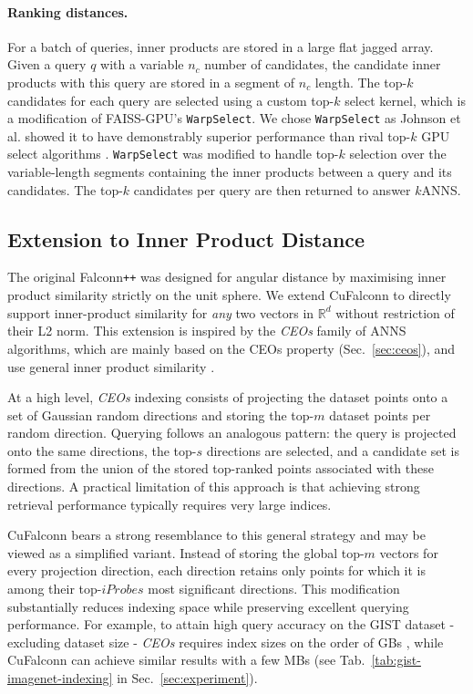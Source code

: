 \documentclass{article}
\newcommand{\Rd}{\mathbb{R}^d}
\newcommand{\ws}{\texttt{WarpSelect}\xspace}
\newcommand{\cf}{CuFalconn\xspace}
\newcommand{\fpp}{Falconn\texttt{++}\xspace}
\newcommand{\fgpu}{FAISS-GPU\xspace}
\begin{document}
\paragraph{Ranking distances.} 

For a batch of queries, inner products are stored in a large flat jagged array. Given a query $q$ with a variable $n_c$ number of candidates, the candidate inner products with this query are stored in a segment of $n_c$ length. The top-$k$ candidates for each query are selected using a custom top-$k$ select kernel, which is a modification of \fgpu's \ws. We chose \ws as Johnson et al. showed it to have demonstrably superior performance than rival top-$k$ GPU select algorithms \cite{johnson2019billion}. \ws was modified to handle top-$k$ selection over the variable-length segments containing the inner products between a query and its candidates. The top-$k$ candidates per query are then returned to answer $k$ANNS.

\subsection{Extension to Inner Product Distance}

The original \fpp was designed for angular distance by maximising inner product similarity strictly on the unit sphere. We extend \cf to directly support inner-product similarity for \emph{any} two vectors in $\Rd$ without restriction of their L2 norm. This extension is inspired by the \textit{CEOs} family of ANNS algorithms, which are mainly based on the CEOs property (Sec.~\ref{sec:ceos}), and use general inner product similarity \cite{pham2021simple}.

At a high level, \textit{CEOs} indexing consists of projecting the dataset points onto a set of Gaussian random directions and storing the top-$m$ dataset points per random direction. Querying follows an analogous pattern: the query is projected onto the same directions, the top-$s$ directions are selected, and a candidate set is formed from the union of the stored top-ranked points associated with these directions. A practical limitation of this approach is that achieving strong retrieval performance typically requires very large indices.

\cf bears a strong resemblance to this general strategy and may be viewed as a simplified variant. Instead of storing the global top-$m$ vectors for every projection direction, each direction retains only points for which it is among their top-$iProbes$ most significant directions. This modification substantially reduces indexing space while preserving excellent querying performance. For example, to attain high query accuracy on the GIST dataset - excluding dataset size - \textit{CEOs} requires index sizes on the order of GBs \cite{pham2021simple}, while \cf can achieve similar results with a few MBs (see Tab.~\ref{tab:gist-imagenet-indexing} in Sec.~\ref{sec:experiment}).
\end{document}
